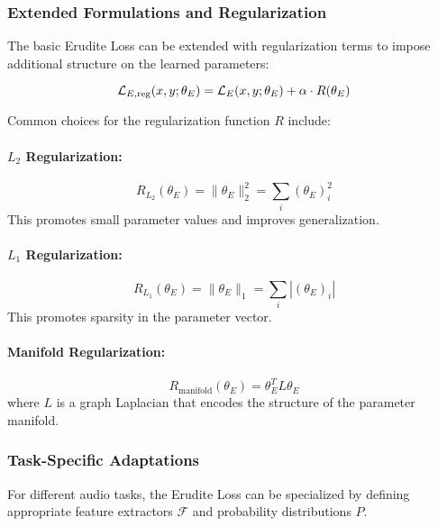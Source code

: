 \subsubsection{Extended Formulations and Regularization}

The basic Erudite Loss can be extended with regularization terms to impose additional structure on the learned parameters:

\begin{equation}
\mathcal{L}_{E,\text{reg}}(x, y; \theta_E) = \mathcal{L}_E(x, y; \theta_E) + \alpha \cdot R(\theta_E)
\end{equation}

Common choices for the regularization function $R$ include:

\paragraph{$L_2$ Regularization:}
\begin{equation}
R_{L_2}(\theta_E) = \|\theta_E\|_2^2 = \sum_i (\theta_E)_i^2
\end{equation}
This promotes small parameter values and improves generalization.

\paragraph{$L_1$ Regularization:}
\begin{equation}
R_{L_1}(\theta_E) = \|\theta_E\|_1 = \sum_i |(\theta_E)_i|
\end{equation}
This promotes sparsity in the parameter vector.

\paragraph{Manifold Regularization:}
\begin{equation}
R_{\text{manifold}}(\theta_E) = \theta_E^T L \theta_E
\end{equation}
where $L$ is a graph Laplacian that encodes the structure of the parameter manifold.

\subsubsection{Task-Specific Adaptations}

For different audio tasks, the Erudite Loss can be specialized by defining appropriate feature extractors $\mathcal{F}$ and probability distributions $P$.

